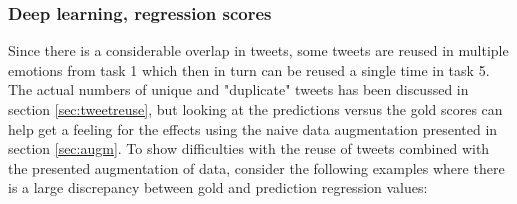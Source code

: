 \subsubsection{Deep learning, regression scores} \label{sec:regscoredeep}
Since there is a considerable overlap in tweets, some tweets are reused in multiple emotions from task 1 which then in turn can be reused a single time in task 5. The actual numbers of unique and "duplicate" tweets has been discussed in section \ref{sec:tweetreuse}, but looking at the predictions versus the gold scores can help get a feeling for the effects using the naive data augmentation presented in section \ref{sec:augm}. To show difficulties with the reuse of tweets combined with the presented augmentation of data, consider the following examples where there is a large discrepancy between gold and prediction regression values:\\
